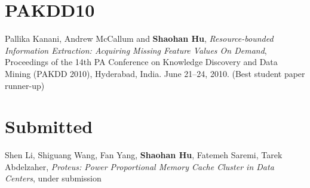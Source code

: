 \section{\sc PAKDD10}
Pallika Kanani, Andrew McCallum and \textbf{Shaohan Hu},
\emph{Resource-bounded Information Extraction: Acquiring Missing
  Feature Values On Demand}, \textsf{Proceedings of the 14th PA Conference on
Knowledge Discovery and Data Mining (PAKDD 2010)}, Hyderabad, India. June
21--24, 2010. (Best student paper runner-up)

\section{\sc Submitted}
Shen Li, Shiguang Wang, Fan Yang, \textbf{Shaohan Hu}, Fatemeh Saremi,
Tarek Abdelzaher, \emph{Proteus: Power Proportional Memory Cache
  Cluster in Data Centers}, under submission %

